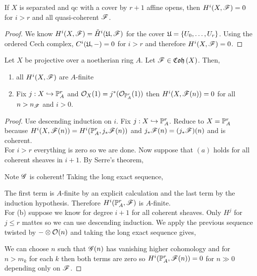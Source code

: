 \documentclass[12pt]{article}
\begin{document}
\begin{lemma}
If $X$ is separated and qc with a cover by $r+1$ affine opens, then $H^i(X, \F) = 0$ for $i > r$ and all quasi-coherent $\F$. 
\end{lemma}

\begin{proof}
We know $H^i(X, \F) = \check{H}^i(\U, \F)$ for the cover $\U = \{ U_0,  \dots, U_r \}$. Using the ordered Cech complex, $C^i(\U, -) = 0$ for $i > r$ and therefore $H^i(X, \F) = 0$.
\end{proof}

\begin{prop}
Let $X$ be projective over a noetherian ring $A$. Let $\F \in \Coh{X}$. Then,
\begin{enumerate}
\item all $H^i(X, \F)$ are $A$-finite
\item Fix $j : X \embed \P^r_A$ and $\struct{X}(1) = j^* (\struct{\P^r_A}(1))$ then $H^i(X, \F(n)) = 0$ for all $n > n_\F$ and $i > 0$. 
\end{enumerate}
\end{prop}

\begin{proof}
Use descending induction on $i$. Fix $j : X \embed \P^r_A$. Reduce to $X = \P^r_A$ because $H^i(X, \F(n)) = H^i(\P^r_A, j_* \F(n))$ and $j_* \F(n) = (j_* \F)(n)$ and is coherent. 
\bigskip\\
For $i > r$ everything is zero so we are done. Now suppose that $(a)$ holds for all coherent sheaves in $i + 1$. By Serre's theorem,
\begin{center}
\end{center}
Note $\G$ is coherent! Taking the long exact sequence,
\begin{center}
\end{center}
The first term is $A$-finite by an explicit calculation and the last term by the induction hypothesis. Therefore $H^i(\P^r_A, \F)$ is $A$-finite. 
\bigskip\\
For (b) suppose we know for degree $i + 1$ for all coherent sheaves. Only $H^j$ for $j \le r$ mattes so we can use descending induction. We apply the previous sequence twisted by $ - \ot \struct{}(n)$ and taking the long exact sequence gives,
\begin{center}
\end{center}
We can choose $n$ such that $\G(n)$ has vanishing higher cohomology and for $n > m_k$ for each $k$ then both terms are zero so $H^i(\P^r_A, \F(n)) = 0$ for $n \gg 0$ depending only on $\F$.
\end{proof}
\end{document}
